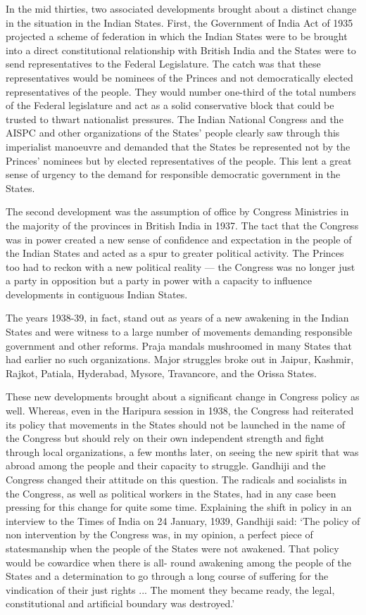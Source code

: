In the mid thirties, two associated developments brought about a distinct change in the situation in the Indian States. First, the Government of India Act of 1935 projected a scheme of federation in which the Indian States were to be brought into a direct constitutional relationship with British India and the States were to send representatives to the Federal Legislature. The catch was that these representatives would be nominees of the Princes and not democratically elected representatives of the people. They would number one-third of the total numbers of the Federal legislature and act as a solid conservative block that could be trusted to thwart nationalist pressures. The Indian National Congress and the AISPC and other organizations of the States' people clearly saw through this imperialist manoeuvre and demanded that the States be represented not by the Princes' nominees but by elected representatives of the people. This lent a great sense of urgency to the demand for responsible democratic government in the States. 

The second development was the assumption of office by Congress Ministries in the majority of the provinces in British India in 1937. The tact that the Congress was in power created a new sense of confidence and expectation in the people of the Indian States and acted as a spur to greater political activity. The Princes too had to reckon with a new political reality — the Congress was no longer just a party in opposition but a party in power with a capacity to influence developments in contiguous Indian States. 

The years 1938-39, in fact, stand out as years of a new awakening in the Indian States and were witness to a large number of movements demanding responsible government and other reforms. Praja mandals mushroomed in many States that had earlier no such organizations. Major struggles broke out in Jaipur, Kashmir, Rajkot, Patiala, Hyderabad, Mysore, Travancore, and the Orissa States. 

These new developments brought about a significant change in Congress policy as well. Whereas, even in the Haripura session in 1938, the Congress had reiterated its policy that movements in the States should not be launched in the name of the Congress but should rely on their own independent strength and fight through local organizations, a few months later, on seeing the new spirit that was abroad among the people and their capacity to struggle. Gandhiji and the Congress changed their attitude on this question. The radicals and socialists in the Congress, as well as political workers in the States, had in any case been pressing for this change for quite some time. Explaining the shift in policy in an interview to the Times of India on 24 January, 1939, Gandhiji said: `The policy of non­ intervention by the Congress was, in my opinion, a perfect piece of statesmanship when the people of the States were not awakened. That policy would be cowardice when there is all- round awakening among the people of the States and a determination to go through a long course of suffering for the vindication of their just rights ... The moment they became ready, the legal, constitutional and artificial boundary was destroyed.' 

